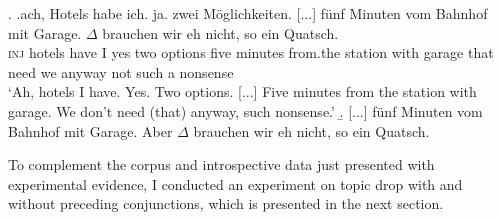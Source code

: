 \ex.
\ag.\label{ex:obj.td.noconj}ach, Hotels habe ich. ja. zwei Möglichkeiten. [...] fünf Minuten vom Bahnhof mit Garage. $\Delta$ brauchen wir eh nicht, so ein Quatsch.\\
\textsc{inj} hotels have I yes two options {} five minutes from.the station with garage that need we anyway not such a nonsense\\
`Ah, hotels I have. Yes. Two options. [...] Five minutes from the station with garage. We don't need (that) anyway, such nonsense.' \newline [FraC D1974--1975]
\b.\label{ex:obj.td.conj} [...] fünf Minuten vom Bahnhof mit Garage. Aber $\Delta$ brauchen wir eh nicht, so ein Quatsch.

To complement the corpus and introspective data just presented with experimental evidence, I conducted an experiment on topic drop with and without preceding conjunctions, which is presented in the next section.

\label{exp:conjunctions}  
